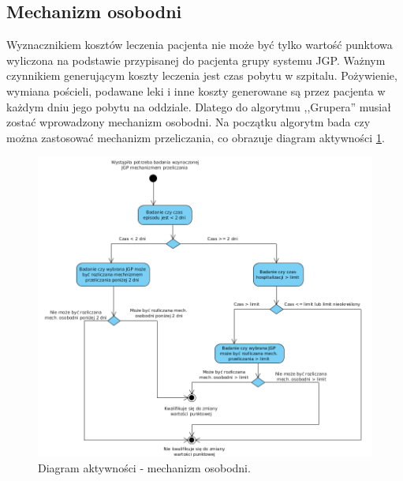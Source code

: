 \subsection{Mechanizm osobodni}
\label{sec:mechanizmOsobodni}
Wyznacznikiem kosztów leczenia pacjenta nie może być tylko wartość punktowa wyliczona na podstawie przypisanej do pacjenta grupy systemu JGP. Ważnym czynnikiem generującym koszty leczenia jest czas pobytu w szpitalu. Pożywienie, wymiana pościeli, podawane leki i inne koszty generowane są przez pacjenta w każdym dniu jego pobytu na oddziale. Dlatego do algorytmu ,,Grupera'' musiał zostać wprowadzony mechanizm osobodni\cite{szkoleniaJGP}. Na początku algorytm bada czy można zastosować mechanizm przeliczania, co obrazuje diagram aktywności \ref{img:diagram_activity_maday}.

\begin{figure}[!ht]
\centering
\includegraphics[scale=0.5]{images/activity-manday}
\caption[Diagram aktywności]{Diagram aktywności - mechanizm osobodni.}
\label{img:diagram_activity_maday}
\end{figure}


